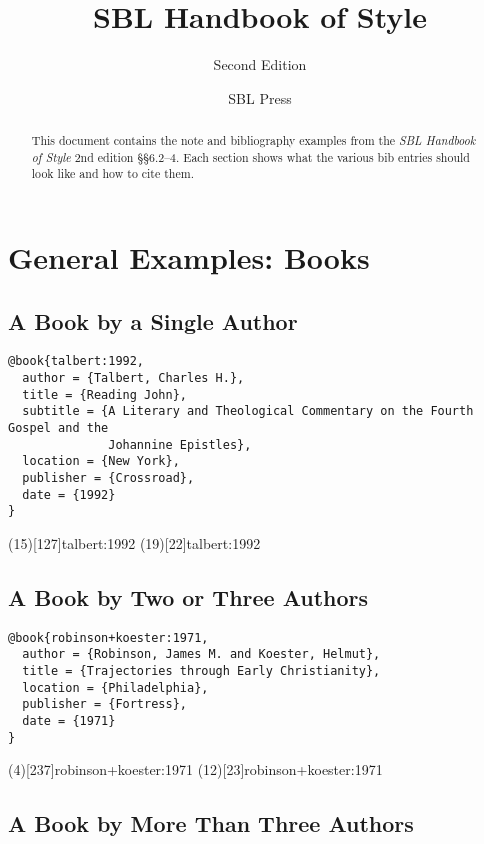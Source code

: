 \documentclass[a4paper]{article}
\begin{document}
\title{SBL Handbook of Style}
\author{Second Edition}
\date{SBL Press}
\maketitle

\begin{abstract}
  This document contains the note and bibliography examples from the \emph{SBL
  Handbook of Style} 2nd edition §§6.2–4. Each section shows what the various
  bib entries should look like and how to cite them.
\end{abstract}

\tableofcontents

\section{General Examples: Books}

\subsection{A Book by a Single Author}

\begin{verbatim}
@book{talbert:1992,
  author = {Talbert, Charles H.},
  title = {Reading John},
  subtitle = {A Literary and Theological Commentary on the Fourth Gospel and the
              Johannine Epistles},
  location = {New York},
  publisher = {Crossroad},
  date = {1992}
}
\end{verbatim}

\examplecite(15)[127]{talbert:1992}
\examplecite(19)[22]{talbert:1992}
\examplebibliography

\subsection{A Book by Two or Three Authors}

\begin{verbatim}
@book{robinson+koester:1971,
  author = {Robinson, James M. and Koester, Helmut},
  title = {Trajectories through Early Christianity},
  location = {Philadelphia},
  publisher = {Fortress},
  date = {1971}
}
\end{verbatim}

\examplecite(4)[237]{robinson+koester:1971}
\examplecite(12)[23]{robinson+koester:1971}
\examplebibliography

\subsection{A Book by More Than Three Authors}
\end{document}
